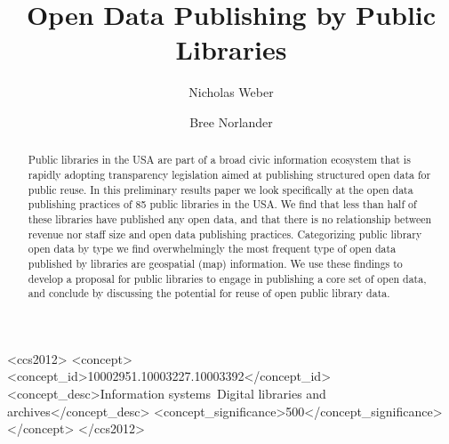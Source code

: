 \documentclass[sigconf]{acmart}
\begin{document}
%
\title{Open Data Publishing by Public Libraries}

%
\author{Nicholas Weber}
\author{Bree Norlander}

%
\renewcommand{\shortauthors}{Weber \& Norlander}

%
\begin{abstract}
Public libraries in the USA are part of a broad civic information ecosystem that is rapidly adopting transparency legislation aimed at publishing structured open data for public reuse. In this preliminary results paper we look specifically at the open data publishing practices of 85 public libraries in the USA. We find that less than half of these libraries have published any open data, and that there is no relationship between revenue nor staff size and open data publishing practices. Categorizing public library open data by type we find overwhelmingly the most frequent type of open data published by libraries are geospatial (map) information. We use these findings to develop a proposal for public libraries to engage in publishing a core set of open data, and conclude by discussing the potential for reuse of open public library data.
\end{abstract}

%
%
\begin{CCSXML}
<ccs2012>
<concept>
<concept_id>10002951.10003227.10003392</concept_id>
<concept_desc>Information systems~Digital libraries and archives</concept_desc>
<concept_significance>500</concept_significance>
</concept>
</ccs2012>
\end{CCSXML}
%
\end{document}
